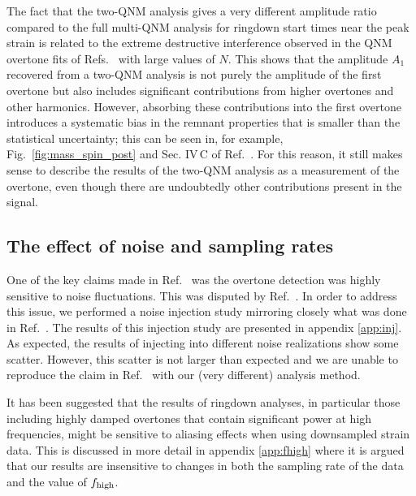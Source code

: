 The fact that the two-QNM analysis gives a very different amplitude ratio compared to the full multi-QNM analysis for ringdown start times near the peak strain is related to the extreme destructive interference observed in the QNM overtone fits of Refs.~\cite{Giesler:2019uxc, Bhagwat:2019dtm, Ota:2019bzl, Cook:2020otn, JimenezForteza:2020cve, Dhani:2020nik, Finch:2021iip, Forteza:2021wfq, Dhani:2021vac, MaganaZertuche:2021syq} with large values of $N$.
This shows that the amplitude $A_1$ recovered from a two-QNM analysis is not purely the amplitude of the first overtone but also includes significant contributions from higher overtones and other harmonics. 
However, absorbing these contributions into the first overtone introduces a systematic bias in the remnant properties that is smaller than the statistical uncertainty; this can be seen in, for example, Fig.~\ref{fig:mass_spin_post} and Sec. IV\,C of Ref.~\cite{Giesler:2019uxc}. 
For this reason, it still makes sense to describe the results of the two-QNM analysis as a measurement of the overtone, even though there are undoubtedly other contributions present in the signal.


\subsection{The effect of noise and sampling rates}\label{subsec:noise}

One of the key claims made in Ref.~\cite{Cotesta:2022pci} was the overtone detection was highly sensitive to noise fluctuations.
This was disputed by Ref.~\cite{Isi:2022mhy}.
In order to address this issue, we performed a noise injection study mirroring closely what was done in Ref.~\cite{Cotesta:2022pci}.
The results of this injection study are presented in appendix \ref{app:inj}.
As expected, the results of injecting into different noise realizations show some scatter.
However, this scatter is not larger than expected and we are unable to reproduce the claim in Ref.~\cite{Cotesta:2022pci} with our (very different) analysis method. 

It has been suggested \cite{WillMaxTGRtelecon} that the results of ringdown analyses, in particular those including highly damped overtones that contain significant power at high frequencies, might be sensitive to aliasing effects when using downsampled strain data.
This is discussed in more detail in appendix \ref{app:fhigh} where it is argued that our results are insensitive to changes in both the sampling rate of the data and the value of $f_{\rm high}$.


